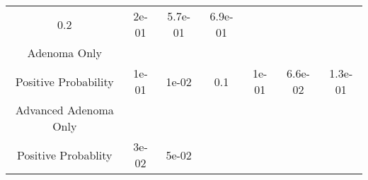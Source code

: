 \documentclass[12pt,]{article}
\begin{document}
\begin{longtable}[]{@{}ccccccc@{}}
\begin{minipage}[t]{0.08\columnwidth}
0.2\strut
\end{minipage} & \begin{minipage}[t]{0.10\columnwidth}\centering\strut
2e-01\strut
\end{minipage} & \begin{minipage}[t]{0.07\columnwidth}\centering\strut
5.7e-01\strut
\end{minipage} & \begin{minipage}[t]{0.09\columnwidth}\centering\strut
6.9e-01\strut
\end{minipage}\tabularnewline
\begin{minipage}[t]{0.26\columnwidth}\centering\strut
Adenoma Only\strut
\end{minipage}\tabularnewline
\begin{minipage}[t]{0.26\columnwidth}\centering\strut
Positive Probability\strut
\end{minipage} & \begin{minipage}[t]{0.09\columnwidth}\centering\strut
1e-01\strut
\end{minipage} & \begin{minipage}[t]{0.11\columnwidth}\centering\strut
1e-02\strut
\end{minipage} & \begin{minipage}[t]{0.08\columnwidth}\centering\strut
0.1\strut
\end{minipage} & \begin{minipage}[t]{0.10\columnwidth}\centering\strut
1e-01\strut
\end{minipage} & \begin{minipage}[t]{0.07\columnwidth}\centering\strut
6.6e-02\strut
\end{minipage} & \begin{minipage}[t]{0.09\columnwidth}\centering\strut
1.3e-01\strut
\end{minipage}\tabularnewline
\begin{minipage}[t]{0.26\columnwidth}\centering\strut
Advanced Adenoma Only\strut
\end{minipage}\tabularnewline
\begin{minipage}[t]{0.26\columnwidth}\centering\strut
Positive Probablity\strut
\end{minipage} & \begin{minipage}[t]{0.09\columnwidth}\centering\strut
3e-02\strut
\end{minipage} & \begin{minipage}[t]{0.11\columnwidth}\centering\strut
5e-02\strut
\end{minipage} & \begin{minipage}[t]{0.08\columnwidth}\centering\strut

\end{minipage}
\end{longtable}
\end{document}
